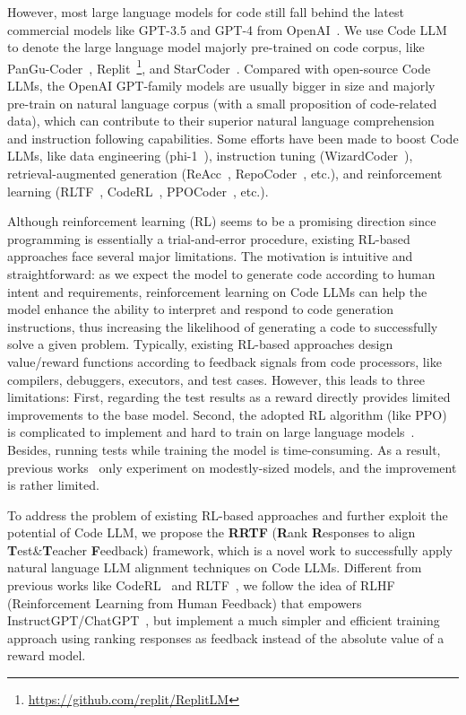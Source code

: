 \documentclass{article}
\begin{document}
However, most large language models for code still fall behind the latest commercial models like GPT-3.5 and GPT-4 from OpenAI~\cite{gpt4-report, sparks}.
We use Code LLM to denote the large language model majorly pre-trained on code corpus, like PanGu-Coder~\cite{pangu-coder}, Replit~\footnote{\url{https://github.com/replit/ReplitLM}}, and StarCoder~\cite{starcoder}.
Compared with open-source Code LLMs, the OpenAI GPT-family models are usually bigger in size and majorly pre-train on natural language corpus (with a small proposition of code-related data), which can contribute to their superior natural language comprehension and instruction following capabilities.
Some efforts have been made to boost Code LLMs, like data engineering (phi-1~\cite{phi-1}), instruction tuning (WizardCoder~\cite{wizardcoder}), retrieval-augmented generation (ReAcc~\cite{reacc}, RepoCoder~\cite{repocoder}, etc.), and reinforcement learning (RLTF~\cite{rltf}, CodeRL~\cite{coderl}, PPOCoder~\cite{ppocoder}, etc.).


Although reinforcement learning (RL) seems to be a promising direction since programming is essentially a trial-and-error procedure, existing RL-based approaches face several major limitations.
The motivation is intuitive and straightforward: as we expect the model to generate code according to human intent and requirements, reinforcement learning on Code LLMs can help the model enhance the ability to interpret and respond to code generation instructions, thus increasing the likelihood of generating a code to successfully solve a given problem.
Typically, existing RL-based approaches design value/reward functions according to feedback signals from code processors, like compilers, debuggers, executors, and test cases. 
However, this leads to three limitations:
First, regarding the test results as a reward directly provides limited improvements to the base model.
Second, the adopted RL algorithm (like PPO) is complicated to implement and hard to train on large language models~\cite{rltf}.
Besides, running tests while training the model is time-consuming.
As a result, previous works~\cite{coderl,rltf} only experiment on modestly-sized models, and the improvement is rather limited.

To address the problem of existing RL-based approaches and further exploit the potential of Code LLM, we propose the \textbf{RRTF} (\textbf{R}ank \textbf{R}esponses to align \textbf{T}est\&\textbf{T}eacher \textbf{F}eedback) framework, which is a novel work to successfully apply natural language LLM alignment techniques on Code LLMs.
Different from previous works like CodeRL~\cite{coderl} and RLTF~\cite{rltf}, we follow the idea of RLHF (Reinforcement Learning from Human Feedback) that empowers InstructGPT/ChatGPT~\cite{instructgpt}, but implement a much simpler and efficient training approach using ranking responses as feedback instead of the absolute value of a reward model.
\end{document}
